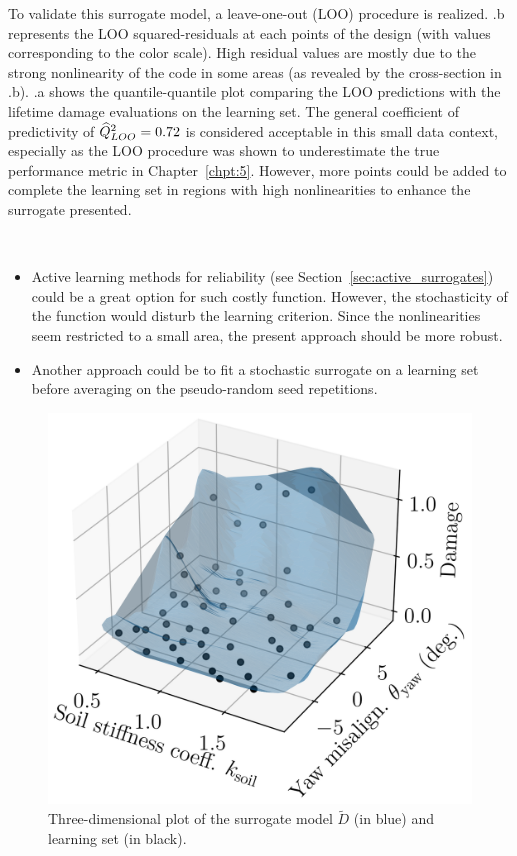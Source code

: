 To validate this surrogate model, a leave-one-out (LOO) procedure is realized. 
.b represents the LOO squared-residuals at each points of the design (with values corresponding to the color scale). 
High residual values are mostly due to the strong nonlinearity of the code in some areas (as revealed by the cross-section in .b).
.a shows the quantile-quantile plot comparing the LOO predictions with the lifetime damage evaluations on the learning set. 
The general coefficient of predictivity of $\widehat{Q}^2_{LOO}=0.72$ is considered acceptable in this small data context, especially as the LOO procedure was shown to underestimate the true performance metric in Chapter~\ref{chpt:5}. 
However, more points could be added to complete the learning set in regions with high nonlinearities to enhance the surrogate presented.  

\begin{remark}
    ~
    \begin{itemize}
        \item Active learning methods for reliability (see Section~\ref{sec:active_surrogates}) could be a great option for such costly function. 
        However, the stochasticity of the function would disturb the learning criterion. Since the nonlinearities seem restricted to a small area, the present approach should be more robust. 
        \item Another approach could be to fit a stochastic surrogate \citep{binois_2019_replication,baker_2022_stochastic_surrogates_review,zhu_2023_thesis} on a learning set before averaging on the pseudo-random seed repetitions.  
    \end{itemize} 
\end{remark}

\begin{figure}[h!]
    \centering
    \includegraphics[width=0.45\linewidth]{./part3/figures/OWT/3D_surrogate.png}
    \caption{Three-dimensional plot of the surrogate model $\widetilde{D}$ (in blue) and learning set (in black).}
    \label{fig:3d_owt_surrogate}
\end{figure}

